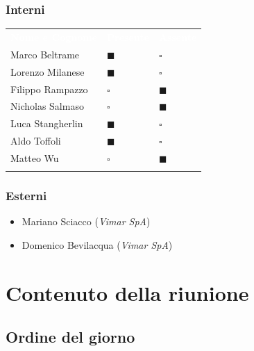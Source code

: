 \documentclass[12pt,a4paper]{article}
\newcommand{\tightlist}{\setlength{\itemsep}{1pt}\setlength{\parskip}{0pt}}
\begin{document}
\hypertarget{interni}{%
\subsubsection{Interni}}

\begin{center}
\begin{tabularx}{\linewidth}{>{\raggedright\arraybackslash}X>{\centering\arraybackslash}p{2.5cm}>{\centering\arraybackslash}p{2.5cm}}
\rowcolor{bfblue}\textcolor{white}{\textbf{Nome e Cognome}} & \textcolor{white}{\textbf{Presente}} & \textcolor{white}{\textbf{Assente}} \\
Marco Beltrame & $\blacksquare$  & $\square$ \\ \arrayrulecolor{bfline}\hline
Lorenzo Milanese & $\blacksquare$ & $\square$ \\ \arrayrulecolor{bfline}\hline
Filippo Rampazzo & $\square$ & $\blacksquare$ \\ \arrayrulecolor{bfline}\hline
Nicholas Salmaso & $\square$ & $\blacksquare$ \\ \arrayrulecolor{bfline}\hline
Luca Stangherlin & $\blacksquare$ & $\square$ \\ \arrayrulecolor{bfline}\hline
Aldo Toffoli & $\blacksquare$ & $\square$ \\ \arrayrulecolor{bfline}\hline
Matteo Wu & $\square$ & $\blacksquare$ \\ \arrayrulecolor{bfline}\hline
\end{tabularx}
\end{center}

\hypertarget{esterni}{%
\subsubsection{Esterni}}

\begin{itemize}
\tightlist
\item
  Mariano Sciacco (\emph{Vimar SpA})
\item
  Domenico Bevilacqua (\emph{Vimar SpA})
\end{itemize}

\vspace{25mm}
  
\hypertarget{contenuto-della-riunione}{%
\section{Contenuto della riunione}}

\hypertarget{ordine-del-giorno}{%
\subsection{Ordine del giorno}}
\end{document}
